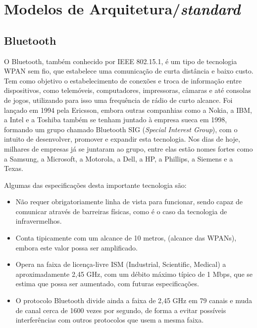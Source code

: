 \documentclass[conference]{IEEEtran}
\begin{document}
\section{Modelos de Arquitetura/\textit{standard}} \label{arquiteturas}

\subsection{Bluetooth} \label{bluetooth}

O Bluetooth, também conhecido por IEEE 802.15.1, é um tipo de tecnologia WPAN sem fio, que estabelece uma comunicação de curta distância e baixo custo. 
Tem como objetivo o estabelecimento de conexões e troca de informação entre dispositivos, como telemóveis, computadores, impressoras, câmaras e até consolas de jogos, utilizando para isso uma frequência de rádio de curto alcance. 
Foi lançado em 1994 pela Ericsson, embora outras companhias como a Nokia, a IBM, a Intel e a Toshiba também se tenham juntado à empresa sueca em 1998, formando um grupo chamado Bluetooth SIG (\textit{Special Interest Group}), com o intuito de desenvolver, promover e expandir esta tecnologia. 
Nos dias de hoje, milhares de empresas já se juntaram ao grupo, entre elas estão nomes fortes como a Samsung, a Microsoft, a Motorola, a Dell, a HP, a Phillips, a Siemens e a Texas.

Algumas das especificações desta importante tecnologia são:

\begin{itemize}

 \item Não requer obrigatoriamente linha de vista para funcionar, sendo capaz de comunicar através de barreiras físicas, como é o caso da tecnologia de infravermelhos.
 \item Conta tipicamente com um alcance de 10 metros, (alcance das WPANs), embora este valor possa ser amplificado. 
 \item Opera na faixa de licença-livre ISM (Industrial, Scientific, Medical) a aproximadamente 2,45 GHz, com um débito máximo típico de 1 Mbps, que se estima que possa ser aumentado, com futuras especificações.
 \item O protocolo Bluetooth divide ainda a faixa de 2,45 GHz em 79 canais e muda de canal cerca de 1600 vezes por segundo, de forma a evitar possíveis interferências com outros protocolos que usem a mesma faixa.

\end{itemize}
\end{document}
